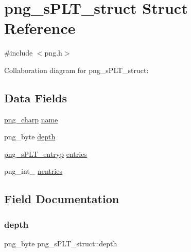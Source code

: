 \hypertarget{structpng__s_p_l_t__struct}{}\section{png\+\_\+s\+P\+L\+T\+\_\+struct Struct Reference}
\label{structpng__s_p_l_t__struct}


{\ttfamily \#include $<$png.\+h$>$}



Collaboration diagram for png\+\_\+s\+P\+L\+T\+\_\+struct\+:
\subsection*{Data Fields}
\begin{DoxyCompactItemize}
\item 
\hyperlink{libpng16_2pngconf_8h_a0d08bb02251d02830803ff5d2d449750}{png\+\_\+charp} \hyperlink{structpng__s_p_l_t__struct_af3b088b149e790b9b98ebedde69a70f0}{name}
\item 
png\+\_\+byte \hyperlink{structpng__s_p_l_t__struct_a6e667882cd16c9675455cebd49898b22}{depth}
\item 
\hyperlink{libpng16_2png_8h_a876dffcd144a34db6e32f9648f032d6e}{png\+\_\+s\+P\+L\+T\+\_\+entryp} \hyperlink{structpng__s_p_l_t__struct_a4c7db13fb1a7f0ede434e174b20151ec}{entries}
\item 
png\+\_\+int\+\_ \hyperlink{structpng__s_p_l_t__struct_ac5844e98e4c43733bad6b83b54dc7a9f}{nentries}
\end{DoxyCompactItemize}


\subsection{Field Documentation}
\mbox{\label{structpng__s_p_l_t__struct_a6e667882cd16c9675455cebd49898b22}} 
\subsubsection{\texorpdfstring{depth}{depth}}
{\footnotesize\ttfamily png\+\_\+byte png\+\_\+s\+P\+L\+T\+\_\+struct\+::depth}

\mbox{\label{structpng__s_p_l_t__struct_a4c7db13fb1a7f0ede434e174b20151ec}} 
